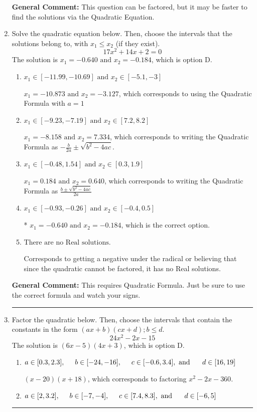 \documentclass{extbook}[14pt]
\newcommand{\litem}[1]{\item #1

\rule{\textwidth}{0.4pt}}
\begin{document}
\begin{enumerate}
{\textbf{General Comment:} This question can be factored, but it may be faster to find the solutions via the Quadratic Equation.
}
\litem{
Solve the quadratic equation below. Then, choose the intervals that the solutions belong to, with $x_1 \leq x_2$ (if they exist).
\[ 17x^{2} +14 x + 2 = 0 \]The solution is \( x_1 = -0.640 \text{ and } x_2 = -0.184 \), which is option D.\begin{enumerate}[label=\Alph*.]
\item \( x_1 \in [-11.99, -10.69] \text{ and } x_2 \in [-5.1, -3] \)

 $x_1 = -10.873 \text{ and } x_2 = -3.127$, which corresponds to using the Quadratic Formula with $a=1$
\item \( x_1 \in [-9.23, -7.19] \text{ and } x_2 \in [7.2, 8.2] \)

 $x_1 = -8.158 \text{ and } x_2 = 7.334$, which corresponds to writing the Quadratic Formula as $-\frac{b}{2a} \pm \sqrt{b^2 - 4ac}$.
\item \( x_1 \in [-0.48, 1.54] \text{ and } x_2 \in [0.3, 1.9] \)

 $x_1 = 0.184 \text{ and } x_2 = 0.640$, which corresponds to writing the Quadratic Formula as $\frac{b \pm \sqrt{b^2 - 4ac}}{2a}$
\item \( x_1 \in [-0.93, -0.26] \text{ and } x_2 \in [-0.4, 0.5] \)

* $x_1 = -0.640 \text{ and } x_2 = -0.184$, which is the correct option.
\item \( \text{There are no Real solutions.} \)

Corresponds to getting a negative under the radical or believing that since the quadratic cannot be factored, it has no Real solutions.
\end{enumerate}

\textbf{General Comment:} This requires Quadratic Formula. Just be sure to use the correct formula and watch your signs.
}
\litem{
Factor the quadratic below. Then, choose the intervals that contain the constants in the form $(ax+b)(cx+d); b \leq d.$
\[ 24x^{2} -2 x -15 \]The solution is \( (6x -5)(4x + 3) \), which is option D.\begin{enumerate}[label=\Alph*.]
\item \( a \in [0.3, 2.3], \hspace*{5mm} b \in [-24, -16], \hspace*{5mm} c \in [-0.6, 3.4], \text{ and } \hspace*{5mm} d \in [16, 19] \)

 $(x -20)(x + 18)$, which corresponds to factoring $x^{2} -2 x -360$.
\item \( a \in [2, 3.2], \hspace*{5mm} b \in [-7, -4], \hspace*{5mm} c \in [7.4, 8.3], \text{ and } \hspace*{5mm} d \in [-6, 5] \)


\end{enumerate}}
\end{enumerate}
\end{document}
